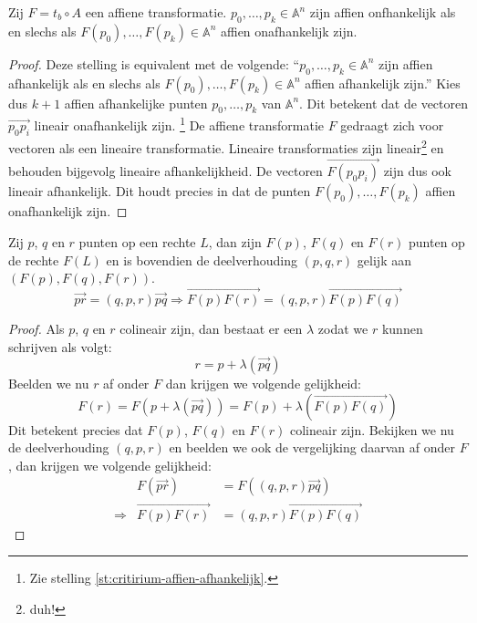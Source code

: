\documentclass[main.tex]{subfiles}
\begin{document}
\begin{st}
  Zij $F = t_{b} \circ A$ een affiene transformatie.
  $p_{0},\dotsc,p_{k} \in \mathbb{A}^{n}$ zijn affien onfhankelijk als en slechs als $F(p_{0}),\dotsc,F(p_{k}) \in \mathbb{A}^{n}$ affien onafhankelijk zijn.

  \begin{proof}
     Deze stelling is equivalent met de volgende: ``$p_{0},\dotsc,p_{k} \in \mathbb{A}^{n}$ zijn affien afhankelijk als en slechs als $F(p_{0}),\dotsc,F(p_{k}) \in \mathbb{A}^{n}$ affien afhankelijk zijn.''
     Kies dus $k+1$ affien afhankelijke punten $p_{0},\dotsc,p_{k}$ van $\mathbb{A}^{n}$.
     Dit betekent dat de vectoren $\overrightarrow{p_{0}p_{i}}$ lineair onafhankelijk zijn. \footnote{Zie stelling \ref{st:critirium-affien-afhankelijk}.}
     De affiene transformatie $F$ gedraagt zich voor vectoren als een lineaire transformatie.
     Lineaire transformaties zijn lineair\footnote{duh!} en behouden bijgevolg lineaire afhankelijkheid.
     De vectoren $\overrightarrow{F(p_{0}p_{i})}$ zijn dus ook lineair afhankelijk.
     Dit houdt precies in dat de punten $F(p_{0}),\dotsc,F(p_{k})$ affien onafhankelijk zijn.
  \end{proof}
\end{st}


\begin{st}
  Zij $p$, $q$ en $r$ punten op een rechte $L$, dan zijn $F(p)$, $F(q)$ en $F(r)$ punten op de rechte $F(L)$ en is bovendien de deelverhouding $(p,q,r)$ gelijk aan $(F(p),F(q),F(r))$.
  \[ 
  \overrightarrow{pr} = (q,p,r) \overrightarrow{pq} \Rightarrow \overrightarrow{F(p)F(r)} = (q,p,r) \overrightarrow{F(p)F(q)}
  \]
  \begin{proof}
    Als $p$, $q$ en $r$ colineair zijn, dan bestaat er een $\lambda$ zodat we $r$ kunnen schrijven als volgt:
    \[ r = p + \lambda(\overrightarrow{pq}) \]
    Beelden we nu $r$ af onder $F$ dan krijgen we volgende gelijkheid:
    \[ F(r) = F(p +\lambda(\overrightarrow{pq})) = F(p) + \lambda(\overrightarrow{F(p)F(q)}) \]
    Dit betekent precies dat $F(p)$, $F(q)$ en $F(r)$ colineair zijn.
    Bekijken we nu de deelverhouding $(q,p,r)$ en beelden we ook de vergelijking daarvan af onder $F$, dan krijgen we volgende gelijkheid:
    \[
    \begin{array}{rrl}
                  & F(\overrightarrow{pr}) &= F((q,p,r) \overrightarrow{pq})\\
      \Rightarrow & \overrightarrow{F(p)F(r)} &= (q,p,r) \overrightarrow{F(p)F(q)}
    \end{array}
    \]
  \end{proof}
\end{st}
\end{document}
